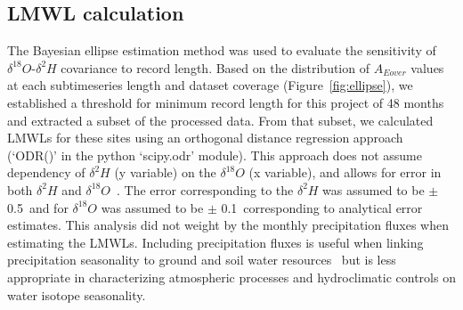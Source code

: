 \documentclass[draft, linenumbers]{agujournal2018}
\begin{document}
\subsection{LMWL calculation}
The Bayesian ellipse estimation method was used to evaluate the sensitivity of $\delta^{18}O$-$\delta^{2}H$ covariance to record length. Based on the distribution of $A_{Eover}$ values at each subtimeseries length and dataset coverage (Figure~\ref{fig:ellipse}), we established a threshold for minimum record length for this project of 48 months and extracted a subset of the processed data. From that subset, we calculated LMWLs  for these sites using an orthogonal distance regression approach (`ODR()' in the python `scipy.odr' module). This approach does not assume dependency of $\delta^{2}H$ (y variable) on the $\delta^{18}O$ (x variable), and allows for error in both $\delta^{2}H$ and $\delta^{18}O$~\citep{Crawford2014}. The error corresponding to the $\delta^{2}H$ was assumed to be $\pm$ 0.5\textperthousand\, and for $\delta^{18}O$ was assumed to be $\pm$ 0.1\textperthousand\, corresponding to analytical error estimates. This analysis did not weight by the monthly precipitation fluxes when estimating the LMWLs. Including precipitation fluxes is useful when linking precipitation seasonality to ground and soil water resources~\citep{Hughes2012, Wang2018} but is less appropriate in characterizing atmospheric processes and hydroclimatic controls on water isotope seasonality. 
\end{document}

